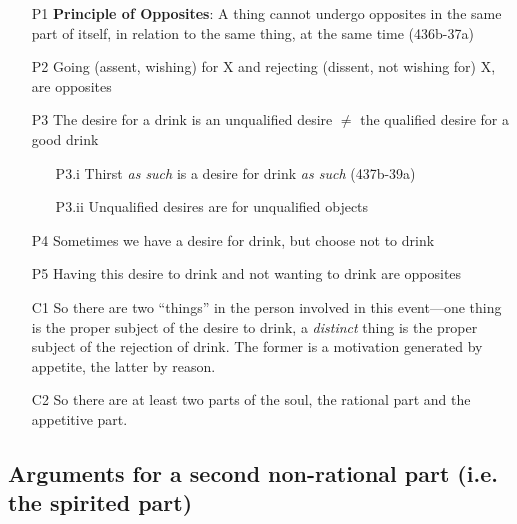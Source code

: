 \documentclass[oneside]{article}
\begin{document}
\begin{enumerate}
\item [P1] \textbf{Principle of Opposites}: A thing cannot undergo opposites in the same part of itself, in relation to the same thing, at the same time (436b-37a)
\item[P2] Going (assent, wishing) for X and rejecting (dissent, not wishing for) X, are opposites
\item[P3] The desire for a drink is an unqualified desire $\neq$ the qualified desire for a good drink
\begin{enumerate}
\item[P3.i] Thirst \emph{as such} is a desire for drink \emph{as such} (437b-39a)
\item[P3.ii] Unqualified desires are for unqualified objects
\end{enumerate}
\item[P4] Sometimes we have a desire for drink, but choose not to drink
\item[P5] Having this desire to drink and not wanting to drink are opposites
\item[C1] So there are two ``things'' in the person involved in this event---one thing is the proper subject of the desire to drink, a \emph{distinct} thing is the proper subject of the rejection of drink. The former is a motivation generated by appetite, the latter by reason.
\item[C2] So there are at least two parts of the soul, the rational part and the appetitive part. 
\end{enumerate}

\subsection*{Arguments for a second non-rational part (i.e. the spirited part)}
\end{document}
